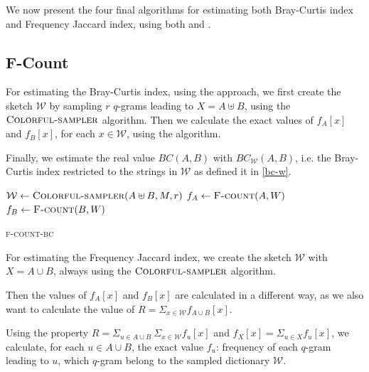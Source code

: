 We now present the four final algorithms for estimating both Bray-Curtis index and Frequency Jaccard index, using both \fcount and \fsamp.

\subsection*{F-Count}

For estimating the Bray-Curtis index, using the \fcount approach, we first create the sketch $\mathcal{W}$ by sampling $r$ $q$-grams leading to $X = A \uplus B$, using the $\textsc{Colorful-sampler}$ algorithm. Then we calculate the exact values of $f_{A}[x]$ and $f_{B}[x]$, for each $x \in \mathcal{W}$, using the \fcount algorithm.

Finally, we estimate the real value $BC(A,B)$ with $BC_{ \mathcal{W} }(A,B)$, i.e. the Bray-Curtis index restricted to the strings in $\mathcal{W}$ as defined it in \eqref{bc-w}.

\begin{algorithm}[h]
	\small
	\DontPrintSemicolon
	\BlankLine
	$\mathcal{W} \gets \textsc{Colorful-sampler}(A \uplus B, M, r)$ \;
	$f_{A} \gets \textsc{F-count}(A, W)$ \;
	$f_{B} \gets \textsc{F-count}(B, W)$ \;
	\BlankLine
	\caption{\textsc{f-count-bc}}
	\label{alg:f-count-bc}
\end{algorithm}

For estimating the Frequency Jaccard index, we create the sketch $\mathcal{W}$ with $X = A \cup B$, always using the $\textsc{Colorful-sampler}$ algorithm. 

Then the values of $f_{A}[x]$ and $f_{B}[x]$ are calculated in a different way, as we also want to calculate the value of $R = \Sigma_{x \in \mathcal{W}} f_{A \cup B}[x]$.

Using the property $R = \Sigma_{u \in A \cup B}\ \Sigma_{x \in \mathcal{W}} f_{u}[x] $ and $f_{X}[x] = \Sigma_{u \in X}{ f_{u}[x] }$, we calculate, for each $u \in A \cup B$, the exact value $f_{u}$: frequency of each $q$-gram leading to $u$, which $q$-gram belong to the sampled dictionary $\mathcal{W}$.

